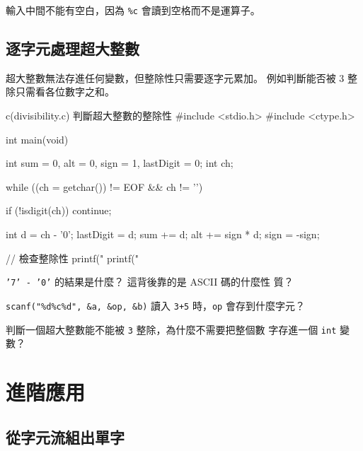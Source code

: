 
輸入中間不能有空白，因為 \texttt{\%c} 會讀到空格而不是運算子。

\subsection{逐字元處理超大整數}

超大整數無法存進任何變數，但整除性只需要逐字元累加。 例如判斷能否被 3
整除只需看各位數字之和。

\begin{example}{c}{(divisibility.c) 判斷超大整數的整除性}
#include <stdio.h>
#include <ctype.h>

int main(void) {
    int sum = 0, alt = 0, sign = 1, lastDigit = 0;
    int ch;

    while ((ch = getchar()) != EOF && ch != '\n') {
        if (!isdigit(ch)) continue;

        int d = ch - '0';
        lastDigit = d;
        sum += d;
        alt += sign * d;
        sign = -sign;
    }

    // 檢查整除性
    printf("%
    printf("%
}
\end{example}



\begin{drills}[label=drills:char-arithmetic]
\item \texttt{'7' - '0'} 的結果是什麼？ 這背後靠的是 ASCII 碼的什麼性
質？
\item \texttt{scanf("\%d\%c\%d", \&a, \&op, \&b)} 讀入 \texttt{3+5}
時，\texttt{op} 會存到什麼字元？
\item 判斷一個超大整數能不能被 \texttt{3} 整除，為什麼不需要把整個數
字存進一個 \texttt{int} 變數？
\end{drills}

\section{進階應用}
\label{sec:char-advanced}

\subsection{從字元流組出單字}

